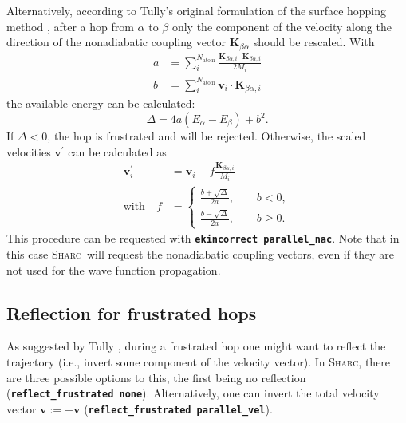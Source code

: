 \documentclass[a4paper,10pt,DIV=15,openany]{scrbook}
\newcommand{\sharc}{\textsc{Sharc}}
\newcommand{\ttt}[1]{\textbf{\texttt{#1}}}
\newcommand{\VEC}[1]{\ensuremath{\mathbf{#1}}}
\begin{document}
Alternatively, according to Tully's original formulation of the surface hopping method \cite{Tully1990JCP}, after a hop from $\alpha$ to $\beta$ only the component of the velocity along the direction of the nonadiabatic coupling vector $\VEC{K}_{\beta\alpha}$ should be rescaled. With
\begin{align}
  a&=\sum\limits_i^{N_\mathrm{atom}} \frac{\VEC{K}_{\beta\alpha, i}\cdot\VEC{K}_{\beta\alpha, i}}{2M_i}\\
  b&=\sum\limits_i^{N_\mathrm{atom}} \VEC{v}_{i}\cdot\VEC{K}_{\beta\alpha, i}
\end{align}
the available energy can be calculated:
\begin{equation}
  \Delta=
  4a
  \left(
    E_\alpha-E_\beta
  \right)+b^2.
\end{equation}
If $\Delta<0$, the hop is frustrated and will be rejected. Otherwise, the scaled velocities $\VEC{v}^\prime$ can be calculated as
\begin{align}
  \VEC{v}_i^\prime&=\VEC{v}_i-f\frac{\VEC{K}_{\beta\alpha, i}}{M_i}\\
  \mathrm{with}\quad f&=
  \begin{cases}
    \frac{b+\sqrt{\Delta}}{2a},\qquad b<0,\\
    \frac{b-\sqrt{\Delta}}{2a},\qquad b\geq 0.
  \end{cases}
\end{align}
This procedure can be requested with \ttt{ekincorrect parallel\_nac}. Note that in this case \sharc\ will request the nonadiabatic coupling vectors, even if they are not used for the wave function propagation.

\subsection{Reflection for frustrated hops}\label{met:refl_frust}

As suggested by Tully \cite{Tully1990JCP}, during a frustrated hop one might want to reflect the trajectory (i.e., invert some component of the velocity vector).
In \sharc, there are three possible options to this, the first being no reflection (\ttt{reflect\_frustrated none}).
Alternatively, one can invert the total velocity vector $\VEC{v}:=-\VEC{v}$ (\ttt{reflect\_frustrated parallel\_vel}).
\end{document}
